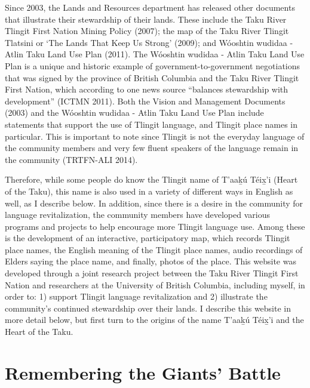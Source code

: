 Since 2003, the Lands and Resources department has released other documents that illustrate their stewardship of their lands. These include the Taku River Tlingit First Nation Mining Policy (2007); the map of the Taku River Tlingit Tlatsini or ‘The Lands That Keep Us Strong’ (2009); and Wóoshtin wudidaa - Atlin Taku Land Use Plan (2011). The Wóoshtin wudidaa - Atlin Taku Land Use Plan is a unique and historic example of government-to-government negotiations that was signed by the province of British Columbia and the Taku River Tlingit First Nation, which according to one news source “balances stewardship with development” (ICTMN 2011). Both the Vision and Management Documents (2003) and the Wóoshtin wudidaa - Atlin Taku Land Use Plan include statements that support the use of Tlingit language, and Tlingit place names in particular. This is important to note since Tlingit is not the everyday language of the community members and very few fluent speakers of the language remain in the community (TRTFN-ALI 2014).

Therefore, while some people do know the Tlingit name of T'aak̲ú Téix̲'i (Heart of the Taku), this name is also used in a variety of different ways in English as well, as I describe below. In addition, since there is a desire in the community for language revitalization, the community members have developed various programs and projects to help encourage more Tlingit language use. Among these is the development of an interactive, participatory map, which records Tlingit place names, the English meaning of the Tlingit place names, audio recordings of Elders saying the place name, and finally, photos of the place. This website was developed through a joint research project between the Taku River Tlingit First Nation and researchers at the University of British Columbia, including myself, in order to: 1) support Tlingit language revitalization and 2) illustrate the community’s continued stewardship over their lands. I describe this website in more detail below, but first turn to the origins of the name T'aak̲ú Téix̲'i and the Heart of the Taku.

\section{Remembering the Giants’ Battle}

